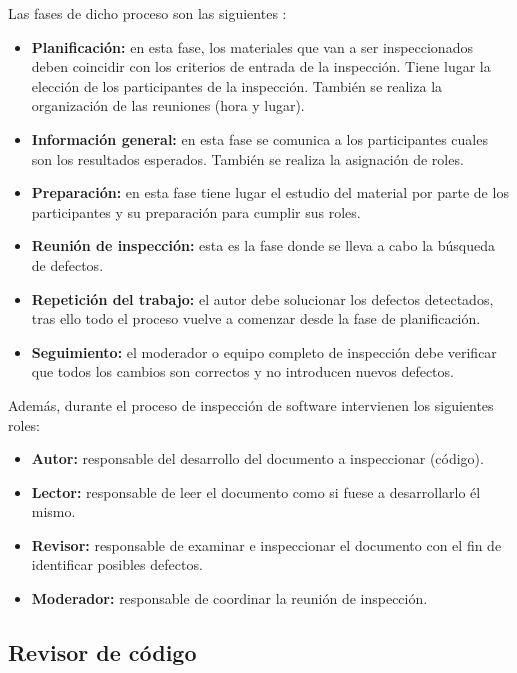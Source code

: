 Las fases de dicho proceso son las siguientes \cite{Fagan:1986:ASI:10677.2412491}:

\begin{itemize}
\tightlist
	\item \textbf{Planificación:} en esta fase, los materiales que van a ser inspeccionados deben coincidir con los criterios de entrada de la inspección. Tiene lugar la elección de los participantes de la inspección. También se realiza la organización de las reuniones (hora y lugar).
	\item \textbf{Información general:} en esta fase se comunica a los participantes cuales son los resultados esperados. También se realiza la asignación de roles.
	\item \textbf{Preparación:} en esta fase tiene lugar el estudio del material por parte de los participantes y su preparación para cumplir sus roles.
	\item \textbf{Reunión de inspección:} esta es la fase donde se lleva a cabo la búsqueda de defectos.
	\item \textbf{Repetición del trabajo:} el autor debe solucionar los defectos detectados, tras ello todo el proceso vuelve a comenzar desde la fase de planificación.
	\item \textbf{Seguimiento:} el moderador o equipo completo de inspección debe verificar que todos los cambios son correctos y no introducen nuevos defectos.
\end{itemize}


Además, durante el proceso de inspección de software intervienen los siguientes roles:

\begin{itemize}
\tightlist
	\item \textbf{Autor:} responsable del desarrollo del documento a inspeccionar (código).
	\item \textbf{Lector:} responsable de leer el documento como si fuese a desarrollarlo él mismo.
	\item \textbf{Revisor:} responsable de examinar e inspeccionar el documento con el fin de identificar posibles defectos.
	\item \textbf{Moderador:} responsable de coordinar la reunión de inspección.
\end{itemize}

\subsection{Revisor de código}

